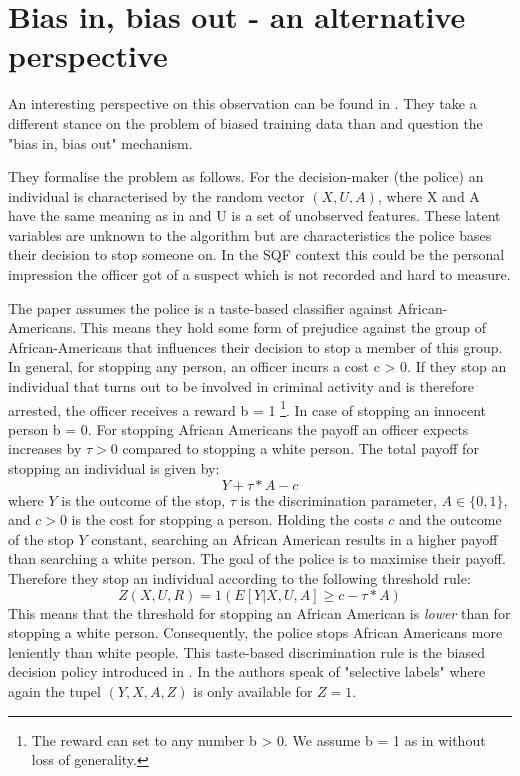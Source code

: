 \section*{Bias in, bias out - an alternative perspective}


An interesting perspective on this observation can be found in \cite{RambachanBBOEFW}. They take a different stance on the problem of biased training data than \cite{kallus2018} and question the "bias in, bias out" mechanism.

They formalise the problem as follows. For the decision-maker (the police) an individual is characterised by the random vector $(X, U, A)$, where X and A have the same meaning as in \cite{kallus2018}
and U is a set of unobserved features. These latent variables are unknown to the algorithm but are characteristics the police bases their decision to stop someone on. In the SQF context this could be the personal impression the officer got of a suspect which is not recorded and hard to measure.

The paper assumes the police is a taste-based classifier against African-Americans. This means they hold some form of prejudice against the group of African-Americans that influences their decision to stop a member of this group.
In general, for stopping any person, an officer incurs a cost c > 0. If they stop an individual that turns out to be involved in criminal activity and is therefore arrested, the officer receives a reward b = 1 \footnote{The reward can set to any number b > 0. We assume b = 1 as in \cite{RambachanBBOEFW} without loss of generality.}. In case of stopping an innocent person b = 0.
For stopping African Americans the payoff an officer expects increases by $\tau > 0$ compared to stopping a white person. The total payoff for stopping an individual is given by:
$$Y + \tau * A - c$$
where $Y$ is the outcome of the stop, $\tau$ is the discrimination parameter, $A \in \{0,1\}$, and $c > 0$ is the cost for stopping a person.
Holding the costs $c$ and the outcome of the stop $Y$ constant, searching an African American results in a higher payoff than searching a white person. The goal of the police is to maximise their payoff. Therefore they stop an individual according to the following threshold rule:
$$Z(X, U, R) = 1(E[Y|X, U, A] \ge c - \tau * A)$$
This means that the threshold for stopping an African American is \textit{lower} than for stopping a white person. Consequently, the police stops African Americans more leniently than white people.
This taste-based discrimination rule is the biased decision policy introduced in \cite{kallus2018}. In \cite{RambachanBBOEFW} the authors speak of "selective labels" where again the tupel $(Y, X, A, Z)$ is only available for $Z = 1$. 

